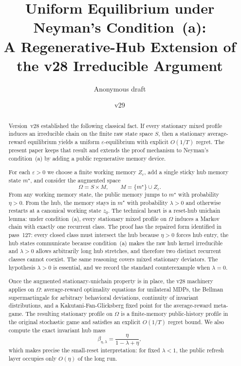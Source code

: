 \documentclass[11pt]{article}
\title{Uniform Equilibrium under Neyman's Condition~(a):\\
A Regenerative-Hub Extension of the v28 Irreducible Argument}
\author{Anonymous draft}
\date{v29}
\theoremstyle{definition}
\newcommand{\1}{\mathbf{1}}
\begin{document}
\maketitle

\begin{abstract}
Version~v28 established the following classical fact. If every stationary mixed profile induces an irreducible chain on the finite raw state space $S$, then a stationary average-reward equilibrium yields a uniform $\varepsilon$-equilibrium with explicit $O(1/T)$ regret. The present paper keeps that result and extends the proof mechanism to Neyman's condition~(a) by adding a public regenerative memory device.

For each $\varepsilon>0$ we choose a finite working memory $Z_\varepsilon$, add a single sticky hub memory state $m^\star$, and consider the augmented space
\[
\Omega=S\times M,
\qquad
M=\{m^\star\}\cup Z_\varepsilon.
\]
From any working memory state, the public memory jumps to $m^\star$ with probability $\eta>0$. From the hub, the memory stays in $m^\star$ with probability $\lambda>0$ and otherwise restarts at a canonical working state $z_0$. The technical heart is a reset-hub unichain lemma: under condition~(a), every stationary mixed profile on $\Omega$ induces a Markov chain with exactly one recurrent class. The proof has the repaired form identified in pass~127: every closed class must intersect the hub because $\eta>0$ forces hub entry, the hub states communicate because condition~(a) makes the raw hub kernel irreducible and $\lambda>0$ allows arbitrarily long hub stretches, and therefore two distinct recurrent classes cannot coexist. The same reasoning covers mixed stationary deviators. The hypothesis $\lambda>0$ is essential, and we record the standard counterexample when $\lambda=0$.

Once the augmented stationary-unichain property is in place, the v28 machinery applies on $\Omega$: average-reward optimality equations for unilateral MDPs, the Bellman supermartingale for arbitrary behavioral deviations, continuity of invariant distributions, and a Kakutani-Fan-Glicksberg fixed point for the average-reward meta-game. The resulting stationary profile on $\Omega$ is a finite-memory public-history profile in the original stochastic game and satisfies an explicit $O(1/T)$ regret bound. We also compute the exact invariant hub mass
\[
\beta_{\eta,\lambda}=\frac{\eta}{1-\lambda+\eta},
\]
which makes precise the small-reset interpretation: for fixed $\lambda<1$, the public refresh layer occupies only $O(\eta)$ of the long run.
\end{abstract}
\end{document}
